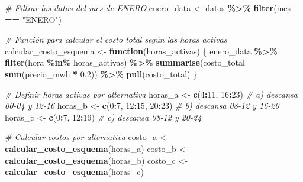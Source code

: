 \documentclass[
]{article}
\newenvironment{Shaded}{\begin{snugshade}}{\end{snugshade}}
\newcommand{\AttributeTok}[1]{\textcolor[rgb]{0.13,0.29,0.53}{#1}}
\newcommand{\CommentTok}[1]{\textcolor[rgb]{0.56,0.35,0.01}{\textit{#1}}}
\newcommand{\ControlFlowTok}[1]{\textcolor[rgb]{0.13,0.29,0.53}{\textbf{#1}}}
\newcommand{\DecValTok}[1]{\textcolor[rgb]{0.00,0.00,0.81}{#1}}
\newcommand{\FloatTok}[1]{\textcolor[rgb]{0.00,0.00,0.81}{#1}}
\newcommand{\FunctionTok}[1]{\textcolor[rgb]{0.13,0.29,0.53}{\textbf{#1}}}
\newcommand{\NormalTok}[1]{#1}
\newcommand{\OtherTok}[1]{\textcolor[rgb]{0.56,0.35,0.01}{#1}}
\newcommand{\SpecialCharTok}[1]{\textcolor[rgb]{0.81,0.36,0.00}{\textbf{#1}}}
\newcommand{\StringTok}[1]{\textcolor[rgb]{0.31,0.60,0.02}{#1}}
\begin{document}
\begin{Shaded}
\begin{Highlighting}[]
\CommentTok{\# Filtrar los datos del mes de ENERO}
\NormalTok{enero\_data }\OtherTok{\textless{}{-}}\NormalTok{ datos }\SpecialCharTok{\%\textgreater{}\%}
  \FunctionTok{filter}\NormalTok{(mes }\SpecialCharTok{==} \StringTok{"ENERO"}\NormalTok{)}

\CommentTok{\# Función para calcular el costo total según las horas activas}
\NormalTok{calcular\_costo\_esquema }\OtherTok{\textless{}{-}} \ControlFlowTok{function}\NormalTok{(horas\_activas) \{}
\NormalTok{  enero\_data }\SpecialCharTok{\%\textgreater{}\%}
    \FunctionTok{filter}\NormalTok{(hora }\SpecialCharTok{\%in\%}\NormalTok{ horas\_activas) }\SpecialCharTok{\%\textgreater{}\%}
    \FunctionTok{summarise}\NormalTok{(}\AttributeTok{costo\_total =} \FunctionTok{sum}\NormalTok{(precio\_mwh }\SpecialCharTok{*} \FloatTok{0.2}\NormalTok{)) }\SpecialCharTok{\%\textgreater{}\%}
    \FunctionTok{pull}\NormalTok{(costo\_total)}
\NormalTok{\}}

\CommentTok{\# Definir horas activas por alternativa}
\NormalTok{horas\_a }\OtherTok{\textless{}{-}} \FunctionTok{c}\NormalTok{(}\DecValTok{4}\SpecialCharTok{:}\DecValTok{11}\NormalTok{, }\DecValTok{16}\SpecialCharTok{:}\DecValTok{23}\NormalTok{)       }\CommentTok{\# a) descansa 00{-}04 y 12{-}16}
\NormalTok{horas\_b }\OtherTok{\textless{}{-}} \FunctionTok{c}\NormalTok{(}\DecValTok{0}\SpecialCharTok{:}\DecValTok{7}\NormalTok{, }\DecValTok{12}\SpecialCharTok{:}\DecValTok{15}\NormalTok{, }\DecValTok{20}\SpecialCharTok{:}\DecValTok{23}\NormalTok{) }\CommentTok{\# b) descansa 08{-}12 y 16{-}20}
\NormalTok{horas\_c }\OtherTok{\textless{}{-}} \FunctionTok{c}\NormalTok{(}\DecValTok{0}\SpecialCharTok{:}\DecValTok{7}\NormalTok{, }\DecValTok{12}\SpecialCharTok{:}\DecValTok{19}\NormalTok{)        }\CommentTok{\# c) descansa 08{-}12 y 20{-}24}

\CommentTok{\# Calcular costos por alternativa}
\NormalTok{costo\_a }\OtherTok{\textless{}{-}} \FunctionTok{calcular\_costo\_esquema}\NormalTok{(horas\_a)}
\NormalTok{costo\_b }\OtherTok{\textless{}{-}} \FunctionTok{calcular\_costo\_esquema}\NormalTok{(horas\_b)}
\NormalTok{costo\_c }\OtherTok{\textless{}{-}} \FunctionTok{calcular\_costo\_esquema}\NormalTok{(horas\_c)}


\end{Highlighting}
\end{Shaded}
\end{document}
